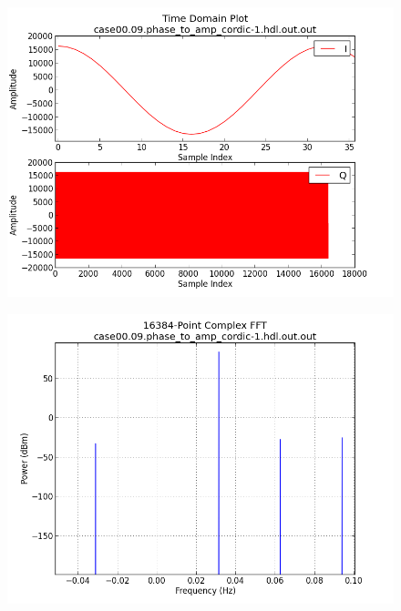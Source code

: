 \documentclass{article}
\begin{document}
\begin{figure}[ht]
	\centering
	\begin{minipage}{.5\textwidth}
		\centering\includegraphics[width=1.0\linewidth]{output}
		\label{fig:output_tdomain}
	\end{minipage}%
	\begin{minipage}{.5\textwidth}
		\centering\includegraphics[width=1.0\linewidth]{output_fft}
		\label{fig:output_fdomain}
	\end{minipage}
\end{figure}
\end{document}
